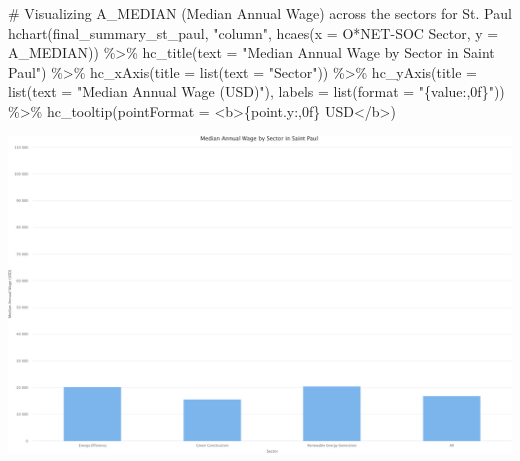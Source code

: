 \documentclass[
  letterpaper,
  DIV=11,
  numbers=noendperiod]{scrartcl}
\newenvironment{Shaded}{\begin{snugshade}}{\end{snugshade}}
\newcommand{\AttributeTok}[1]{\textcolor[rgb]{0.40,0.45,0.13}{#1}}
\newcommand{\CommentTok}[1]{\textcolor[rgb]{0.37,0.37,0.37}{#1}}
\newcommand{\FunctionTok}[1]{\textcolor[rgb]{0.28,0.35,0.67}{#1}}
\newcommand{\NormalTok}[1]{\textcolor[rgb]{0.00,0.23,0.31}{#1}}
\newcommand{\SpecialCharTok}[1]{\textcolor[rgb]{0.37,0.37,0.37}{#1}}
\newcommand{\StringTok}[1]{\textcolor[rgb]{0.13,0.47,0.30}{#1}}
\begin{document}
\begin{Shaded}
\begin{Highlighting}[]
\CommentTok{\# Visualizing A\_MEDIAN (Median Annual Wage) across the sectors for St. Paul}
\FunctionTok{hchart}\NormalTok{(final\_summary\_st\_paul, }\StringTok{"column"}\NormalTok{, }\FunctionTok{hcaes}\NormalTok{(}\AttributeTok{x =} \StringTok{\textasciigrave{}}\AttributeTok{O*NET{-}SOC Sector}\StringTok{\textasciigrave{}}\NormalTok{, }\AttributeTok{y =}\NormalTok{ A\_MEDIAN)) }\SpecialCharTok{\%\textgreater{}\%}
  \FunctionTok{hc\_title}\NormalTok{(}\AttributeTok{text =} \StringTok{"Median Annual Wage by Sector in Saint Paul"}\NormalTok{) }\SpecialCharTok{\%\textgreater{}\%}
  \FunctionTok{hc\_xAxis}\NormalTok{(}\AttributeTok{title =} \FunctionTok{list}\NormalTok{(}\AttributeTok{text =} \StringTok{"Sector"}\NormalTok{)) }\SpecialCharTok{\%\textgreater{}\%}
  \FunctionTok{hc\_yAxis}\NormalTok{(}\AttributeTok{title =} \FunctionTok{list}\NormalTok{(}\AttributeTok{text =} \StringTok{"Median Annual Wage (USD)"}\NormalTok{), }\AttributeTok{labels =} \FunctionTok{list}\NormalTok{(}\AttributeTok{format =} \StringTok{"\{value:,0f\}"}\NormalTok{)) }\SpecialCharTok{\%\textgreater{}\%}
  \FunctionTok{hc\_tooltip}\NormalTok{(}\AttributeTok{pointFormat =} \StringTok{\textquotesingle{}\textless{}b\textgreater{}\{point.y:,0f\} USD\textless{}/b\textgreater{}\textquotesingle{}}\NormalTok{)}
\end{Highlighting}
\end{Shaded}

\includegraphics{index_files/figure-pdf/unnamed-chunk-21-4.pdf}
\end{document}

